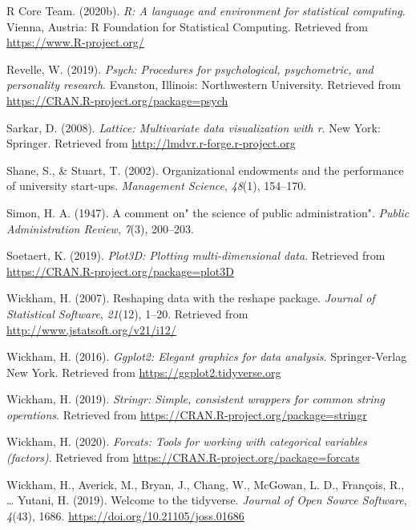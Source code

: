 \documentclass[
  english,
  man]{apa6}
\begin{document}
\leavevmode\hypertarget{ref-R-base}{}%
R Core Team. (2020b). \emph{R: A language and environment for statistical computing}. Vienna, Austria: R Foundation for Statistical Computing. Retrieved from \url{https://www.R-project.org/}

\leavevmode\hypertarget{ref-R-psych}{}%
Revelle, W. (2019). \emph{Psych: Procedures for psychological, psychometric, and personality research}. Evanston, Illinois: Northwestern University. Retrieved from \url{https://CRAN.R-project.org/package=psych}

\leavevmode\hypertarget{ref-R-lattice}{}%
Sarkar, D. (2008). \emph{Lattice: Multivariate data visualization with r}. New York: Springer. Retrieved from \url{http://lmdvr.r-forge.r-project.org}

\leavevmode\hypertarget{ref-shane2002organizational}{}%
Shane, S., \& Stuart, T. (2002). Organizational endowments and the performance of university start-ups. \emph{Management Science}, \emph{48}(1), 154--170.

\leavevmode\hypertarget{ref-simon1947comment}{}%
Simon, H. A. (1947). A comment on" the science of public administration". \emph{Public Administration Review}, \emph{7}(3), 200--203.

\leavevmode\hypertarget{ref-R-plot3D}{}%
Soetaert, K. (2019). \emph{Plot3D: Plotting multi-dimensional data}. Retrieved from \url{https://CRAN.R-project.org/package=plot3D}

\leavevmode\hypertarget{ref-R-reshape2}{}%
Wickham, H. (2007). Reshaping data with the reshape package. \emph{Journal of Statistical Software}, \emph{21}(12), 1--20. Retrieved from \url{http://www.jstatsoft.org/v21/i12/}

\leavevmode\hypertarget{ref-R-ggplot2}{}%
Wickham, H. (2016). \emph{Ggplot2: Elegant graphics for data analysis}. Springer-Verlag New York. Retrieved from \url{https://ggplot2.tidyverse.org}

\leavevmode\hypertarget{ref-R-stringr}{}%
Wickham, H. (2019). \emph{Stringr: Simple, consistent wrappers for common string operations}. Retrieved from \url{https://CRAN.R-project.org/package=stringr}

\leavevmode\hypertarget{ref-R-forcats}{}%
Wickham, H. (2020). \emph{Forcats: Tools for working with categorical variables (factors)}. Retrieved from \url{https://CRAN.R-project.org/package=forcats}

\leavevmode\hypertarget{ref-R-tidyverse}{}%
Wickham, H., Averick, M., Bryan, J., Chang, W., McGowan, L. D., François, R., \ldots{} Yutani, H. (2019). Welcome to the tidyverse. \emph{Journal of Open Source Software}, \emph{4}(43), 1686. \url{https://doi.org/10.21105/joss.01686}
\end{document}
